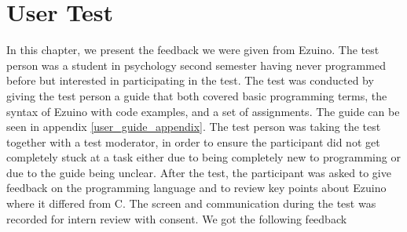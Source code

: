 \section{User Test}
In this chapter, we present the feedback we were given from Ezuino. The test person was a student in psychology second semester having never programmed before but interested in participating in the test. The test was conducted by giving the test person a guide that both covered basic programming terms, the syntax of Ezuino with code examples, and a set of assignments. The guide can be seen in appendix \ref{user_guide_appendix}. The test person was taking the test together with a test moderator, in order to ensure the participant did not get completely stuck at a task either due to being completely new to programming or due to the guide being unclear. After the test, the participant was asked to give feedback on the programming language and to review key points about Ezuino where it differed from C. The screen and communication during the test was recorded for intern review with consent.
We got the following feedback

